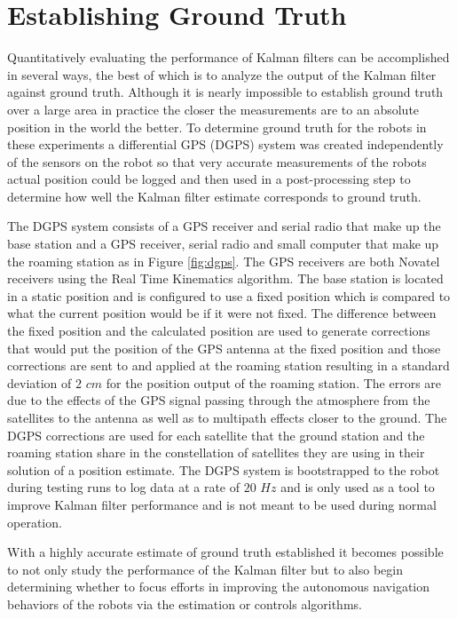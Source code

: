 \section{Establishing Ground Truth}
\label{sec:groundtruth}
Quantitatively evaluating the performance of Kalman filters can be accomplished in several ways, the best of which is to analyze the output of the Kalman filter against ground truth. Although it is nearly impossible to establish ground truth over a large area in practice the closer the measurements are to an absolute position in the world the better. To determine ground truth for the robots in these experiments a differential GPS (DGPS) system was created independently of the sensors on the robot so that very accurate measurements of the robots actual position could be logged and then used in a post-processing step to determine how well the Kalman filter estimate corresponds to ground truth.

The DGPS system consists of a GPS receiver and serial radio that make up the base station and a GPS receiver, serial radio and small computer that make up the roaming station as in Figure \ref{fig:dgps}. The GPS receivers are both Novatel receivers using the Real Time Kinematics algorithm. The base station is located in a static position and is configured to use a fixed position which is compared to what the current position would be if it were not fixed. The difference between the fixed position and the calculated position are used to generate corrections that would put the position of the GPS antenna at the fixed position and those corrections are sent to and applied at the roaming station resulting in a standard deviation of $2$ $cm$ for the position output of the roaming station. The errors are due to the effects of the GPS signal passing through the atmosphere from the satellites to the antenna as well as to multipath effects closer to the ground. The DGPS corrections are used for each satellite that the ground station and the roaming station share in the constellation of satellites they are using in their solution of a position estimate. The DGPS system is bootstrapped to the robot during testing runs to log data at a rate of $20$ $Hz$ and is only used as a tool to improve Kalman filter performance and is not meant to be used during normal operation.

With a highly accurate estimate of ground truth established it becomes possible to not only study the performance of the Kalman filter but to also begin determining whether to focus efforts in improving the autonomous navigation behaviors of the robots via the estimation or controls algorithms.

